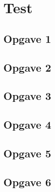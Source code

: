 \chapter{Test}
\section{Opgave 1}

\section{Opgave 2}

\section{Opgave 3}

\section{Opgave 4}

\section{Opgave 5}

\section{Opgave 6}
